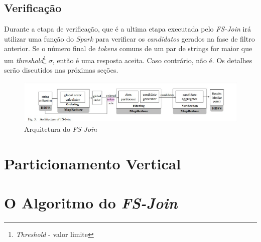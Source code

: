 \subsection{Verificação}

Durante a etapa de verificação, que é a ultima etapa executada pelo \textit{FS-Join} irá utilizar uma função do \textit{Spark}  para verificar os \textit{candidatos} gerados na fase de filtro anterior. Se o número final de \textit{tokens} comuns de um par de strings for maior que um \textit{threshold}\footnote{\textit{Threshold} - valor limite} $\sigma$, então é uma resposta aceita. Caso contrário, não é. Os detalhes serão discutidos nas próximas seções.
\begin{figure}[ht]
\centering
\includegraphics[scale=0.4]{fig/arqFSJoin.jpg}
\caption{Arquitetura do \textit{FS-Join}}
\end{figure}

\section{Particionamento Vertical}



\section{O Algoritmo do \textit{FS-Join}}

%
